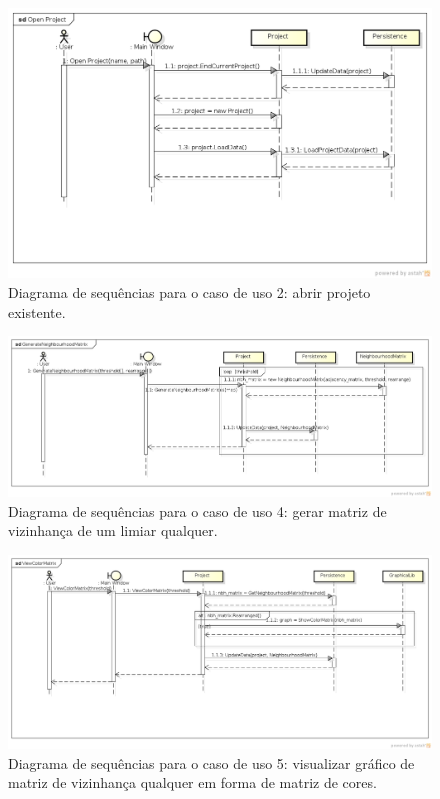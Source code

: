 \begin{figure}
\centering
\includegraphics[scale=0.47]{open-project}
\caption{Diagrama de sequências para o caso de uso 2: abrir projeto existente.}
\label{fig:open-project}
\end{figure}

\begin{figure}
\centering
\includegraphics[scale=0.37]{generate-neighbourhood-matrix}
\caption{Diagrama de sequências para o caso de uso 4: gerar matriz de vizinhança de um limiar qualquer.}
\label{fig:generate-neighbourhood-matrix}
\end{figure}

\begin{figure}
\centering
\includegraphics[scale=0.43]{view-color-matrix}
\caption{Diagrama de sequências para o caso de uso 5: visualizar gráfico de matriz de vizinhança qualquer em forma de matriz de cores.}
\label{fig:view-color-matrix}
\end{figure}

